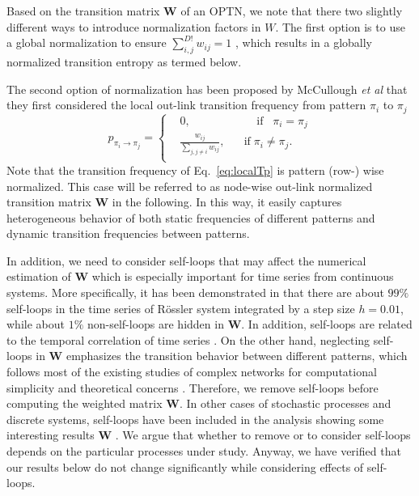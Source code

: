 \documentclass[12pt,aip,cha,reprint,nofootinbib]{revtex4-1}
\begin{document}
Based on the transition matrix $\mathbf{W}$ of an OPTN, we note that there two slightly different ways to introduce normalization factors in $W$. The first option is to use a global normalization to ensure $\sum_{i,j}^{D!} w_{ij} = 1$ \cite{zhangSciRep2017}, which results in a globally normalized transition entropy as termed below.  

The second option of normalization has been proposed by McCullough {\textit{et al}} \cite{McCullough2017b} that they first considered the local out-link transition frequency from pattern $\pi_i$ to $\pi_j$
\begin{equation} \label{eq:localTp}
p_{\pi_i \to \pi_j} = \left \{ \begin{aligned}
				& 0,  \;\;\;\;\;\;\;\;\;\;\;\;\;\;\;\;\;\;\;\;\; \text{if} \;\;\; \pi_i = \pi_j \\
				& \frac{w_{ij}}{\sum_{j, j \neq i} w_{ij}}, \;\;\;\;\;\; \text{if} \; \pi_i \neq \pi_j.\\
				\end{aligned}
				\right.
\end{equation}		
Note that the transition frequency of Eq.~\eqref{eq:localTp} is pattern (row-) wise normalized. This case will be referred to as node-wise out-link normalized transition matrix $\mathbf{W}$ in the following. In this way, it easily captures heterogeneous behavior of both static frequencies of different patterns and dynamic transition frequencies between patterns. 

In addition, we need to consider self-loops that may affect the numerical estimation of $\mathbf{W}$ which is especially important for time series from continuous systems. More specifically, it has been demonstrated in \cite{zhangSciRep2017} that there are about $99\%$ self-loops in the time series of R\"ossler system integrated by a step size $h = 0.01$, while about $1\%$ non-self-loops are hidden in $\mathbf{W}$. In addition, self-loops are related to the temporal correlation of time series \cite{BorgesAMC2019}. On the other hand, neglecting self-loops in $\mathbf{W}$ emphasizes the transition behavior between different patterns, which follows most of the existing studies of complex networks for computational simplicity and theoretical concerns \cite{CostaADPhy2007}. Therefore, we remove self-loops before computing the weighted matrix $\mathbf{W}$. In other cases of stochastic processes and discrete systems, self-loops have been included in the analysis showing some interesting results $\mathbf{W}$ \cite{BorgesAMC2019}. We argue that whether to remove or to consider self-loops depends on the particular processes under study. Anyway, we have verified that our results below do not change significantly while considering effects of self-loops.
\end{document}
